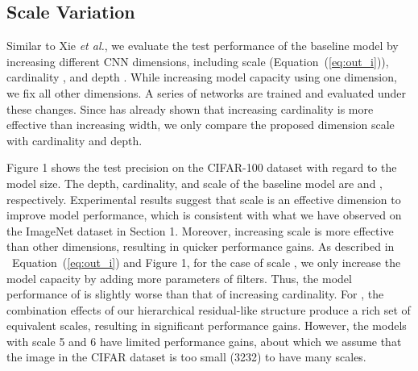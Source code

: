 \documentclass[10pt,journal,cspaper,compsoc]{IEEEtran}
\newcommand{\CheckRmv}[1]{}
\newcommand{\figref}[1]{Figure 1}\newcommand{\tabref}[1]{Table 1}\newcommand{\secref}[1]{Section 1}
\renewcommand{\eqref}[1]{Equation 1}
\newcommand{\CheckRmv}[1]{#1}
\newcommand{\figref}[1]{Fig.~\ref{#1}}\newcommand{\tabref}[1]{Table~\ref{#1}}\newcommand{\secref}[1]{Sec.~\ref{#1}}
\renewcommand{\eqref}[1]{Equation~(\ref{#1})}
\def\etal{{\em et al.}}
\def\etal{{\em et al.}}
\begin{document}
\subsection{Scale Variation}
\label{sec:compare_dimentions}

Similar to Xie \etal \cite{xie2017aggregated},
we evaluate the test performance of the baseline model by increasing
different CNN dimensions,
including scale (\eqref{eq:out_i}), cardinality \cite{xie2017aggregated},
and depth \cite{simonyan2014very}.
While increasing model capacity using one dimension,
we fix all other dimensions.
A series of networks are trained and evaluated under these changes.
Since \cite{xie2017aggregated} has already shown that increasing cardinality
is more effective than increasing width,
we only compare the proposed dimension scale with cardinality and depth.


\figref{fig:cmp_scale_card} shows the test precision on the CIFAR-100 dataset
with regard to the model size.
The depth, cardinality, and scale of the baseline model are
 and , respectively.
Experimental results suggest that scale is an effective dimension
to improve model performance,
which is consistent with what we have observed on the ImageNet dataset
in \secref{sec:Experiments_ImageNet}.
Moreover, increasing scale is more effective than other dimensions,
resulting in quicker performance gains.
As described in ~\eqref{eq:out_i} and \figref{fig:structure},
for the case of scale ,
we only increase the model capacity by adding more parameters
of  filters.
Thus, the model performance of  is slightly worse
than that of increasing cardinality.
For , the combination effects of our hierarchical residual-like
structure produce a rich set of equivalent scales,
resulting in significant performance gains.
However, the models with scale 5 and 6 have limited performance gains,
about which we assume that the image in the CIFAR dataset is too small (3232)
to have many scales.

\CheckRmv{
\begin{figure}[t]
  \centering
  \begin{overpic}[width=\linewidth]{cmp_scale_card.pdf}
    \put(22,21.5){2} \put(39.5,31){3} \put(54,48){4}
    \put(66,47){5} \put(80,51){6}
\put(30,20){12} \put(43,25){18} \put(56,31.5){24}
    \put(70,32.5){30} \put(84,33){36}
\put(29,14.5){56} \put(44,12){83} \put(58,13.5){110}
    \put(73,13.5){137} \put(87,19.5){164}
\put(14,10){29-6-1} \end{overpic}
  \caption{Test precision on the CIFAR-100 dataset with regard to the model size,
  	by changing cardinality (ResNeXt-29), depth (ResNeXt),
  	and scale (Res2Net-29).
  }\label{fig:cmp_scale_card}
\end{figure}
}
\end{document}
